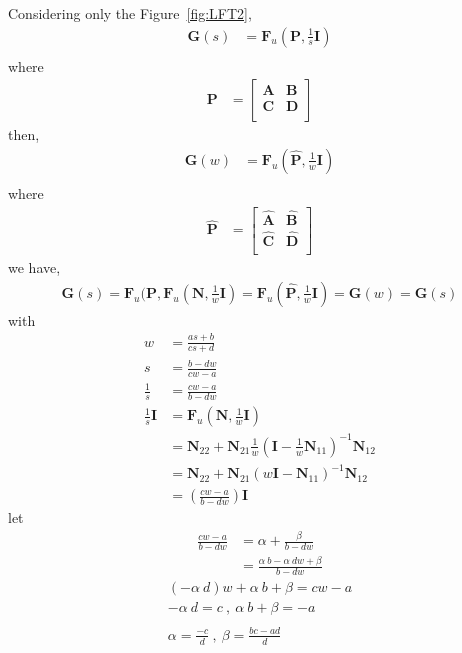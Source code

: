 \documentclass{scrreprt}
\begin{document}
Considering only the Figure~\ref{fig:LFT2},
\begin{align*}
\bm{G}(s) &= \bm{F}_u(\bm{P},\frac{1}{s}\bm{I}) \\
\end{align*}
where
\begin{align*}
\bm{P} &= 
\begin{bmatrix}
\bm{A} & \bm{B}\\
\bm{C} & \bm{D}\\
\end{bmatrix}
\end{align*}
then,
\begin{align*}
\bm{G}(w) &= \bm{F}_u(\hat{\bm{P}},\frac{1}{w}\bm{I}) \\
\end{align*}
where
\begin{align*}
\hat{\bm{P}} &= 
\begin{bmatrix}
\hat{\bm{A}} & \hat{\bm{B}} \\
\hat{\bm{C}} & \hat{\bm{D}} \\
\end{bmatrix}
\end{align*}
we have,
\begin{align*}
\bm{G}(s) = \bm{F}_u(\bm{P},\bm{F}_u(\bm{N},\frac{1}{w}\bm{I}) = \bm{F}_u(\hat{\bm{P}},\frac{1}{w}\bm{I}) = \bm{G}(w) = \hat{\bm{G}}(s)
\end{align*}
with
\begin{align*}
w &= \frac{as+b}{cs+d}\\
s &= \frac{b-dw}{cw-a}\\
\frac{1}{s} &= \frac{cw-a}{b-dw}\\
\frac{1}{s}\bm{I} &= \bm{F}_u(\bm{N},\frac{1}{w}\bm{I})\\
	&= \bm{N}_{22} + \bm{N}_{21}\frac{1}{w}(\bm{I}-\frac{1}{w}\bm{N}_{11})^{-1}\bm{N}_{12}\\
	&= \bm{N}_{22} + \bm{N}_{21}(w\bm{I}-\bm{N}_{11})^{-1}\bm{N}_{12}\\
	&= (\frac{cw-a}{b-dw}) \bm{I}
\end{align*}
let
\begin{align*}
\frac{cw-a}{b-dw} &= \alpha + \frac{\beta}{b-dw}\\
	&= \frac{\alpha\:b-\alpha\:dw+\beta}{b-dw}
\end{align*}
\begin{align*}
(-\alpha\:d)w + \alpha\:b+\beta = cw-a\\
-\alpha\:d =c \:,\: \alpha\:b+\beta = -a\\
\\
\alpha=\frac{-c}{d} \:,\: \beta = \frac{bc-ad}{d}
\end{align*}
\end{document}
